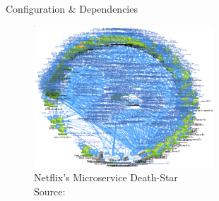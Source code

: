 \documentclass{beamer}
\begin{document}
\begin{frame}{}
  \begin{center}
    \Large Configuration \& Dependencies
  \end{center}
  \begin{figure}
    \includegraphics[width=0.6\textwidth]{img/netfix.png}
    \caption{\footnotesize Netflix's Microservice Death-Star \\\textcolor{uos-grey-full}{Source: {\cite{deathstar}}}}
  \end{figure}
\end{frame}
\end{document}
